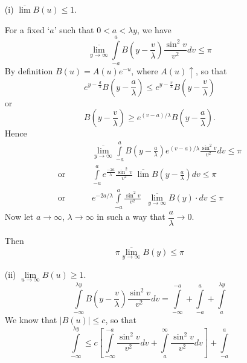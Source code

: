 \medskip
{}
\begin{itemize}
\item[(i)] $\overline{\lim} B(u) \leq 1$.

For a fixed `$a$' such that $0<a< \lambda y$, we have
$$
\overline{\lim\limits_{y \to \infty}}\int\limits^a_{-a} B\left(y -
\frac{v}{\lambda} \right) \frac{\sin^2 v}{v^2} dv \leq \pi
$$
By definition $B(u) = A(u)e^{-u}$, where $A(u) \uparrow$, so that
$$ 
e^{y -\frac{d}{\lambda}} B \left(y - \frac{a}{\lambda} \right) \leq e^{y -
  \frac{v}{\lambda}} B \left(y -\frac{v}{\lambda} \right)
$$
or
$$
B \left(y -\frac{v}{\lambda} \right) \geq e^{(v-a)/\lambda}
B \left(y-\frac{a}{\lambda} \right). 
$$
Hence
\begin{align*}
& \overline{\lim\limits_{y\to\infty}} \int\limits^a_{-a} B \left(y -
\frac{a}{\lambda} \right) e^{(v-a)/\lambda} \frac{\sin^2 v}{v^2} dv \leq \pi
\\
\text{or }\qquad & \int\limits^a_{-a} e^{\frac{-2a}{\lambda}}
\frac{\sin^2v}{v^2}\;  \overline{\lim} B \left(y -\frac{a}{\lambda} \right) dv \leq \pi \qquad \\
\text{or } \qquad & e^{-2a/\lambda} \int\limits^a_{-a} \frac{\sin^2
  v}{v^2} \;\; \overline{\lim\limits_{y \to \infty}} B(y) \cdot dv \leq \pi 
 \qquad 
\end{align*}\pageoriginale
Now let $a\to \infty$, $\lambda\to\infty$ in such a way that
$\dfrac{a}{\lambda} \to 0$. 

Then
$$
\pi \overline{\lim\limits_{y \to \infty}} B(y) \leq \pi
$$

\item[(ii)] $\lim\limits_{u\to\infty} B(u) \geq 1$.
\begin{equation*}
 \int\limits^{\lambda y}_{-\infty} B \left(y -\frac{v}{\lambda} \right)
\frac{\sin^2 v}{v^2} dv = \int\limits^{-a}_{-\infty} +
\int\limits^a_{-a} + \int\limits^{\lambda y}_a  \tag*{$(\circledast)$}
\end{equation*}
We know that $|B(u)| \leq c$, so that
$$
\int\limits^{\lambda y}_{-\infty} \leq c
\left[\int\limits^{-a}_{-\infty} \frac{\sin^2 v}{v^2} dv +
  \int\limits^\infty_a \frac{\sin^2 v}{v^2} dv \right] +
\int\limits^a_{-a} 
$$
\end{itemize}

